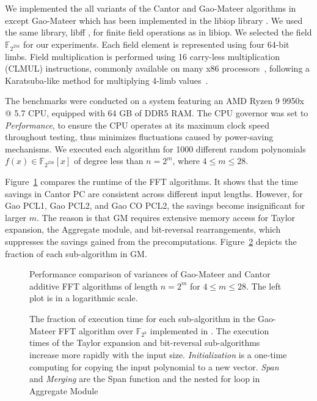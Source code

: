 We implemented the all variants of the Cantor and Gao-Mateer algorithms in \CC except Gao-Mateer which has been implemented in the libiop library \cite{libiop}. We used the same library, libff \cite{libff}, for finite field operations as in libiop. We selected the field $\mathbb{F}_{2^{256}}$ for our experiments. Each field element is represented using four 64-bit limbs. Field multiplication is performed using 16 carry-less multiplication (CLMUL) instructions, commonly available on many x86 processors~\cite{gueron2010intel}, following a Karatsuba-like method for multiplying 4-limb values~\cite{libiop}.

The benchmarks were conducted on a system featuring an AMD Ryzen 9 9950x @ 5.7 CPU, equipped with 64 GB of DDR5 RAM. The CPU governor was set to \textit{Performance}, to ensure the CPU operates at its maximum clock speed throughout testing, thus minimizes fluctuations caused by power-saving mechanisms.
We executed each algorithm for 1000 different random polynomials \( f(x) \in \mathbb{F}_{2^{256}}[x] \) of degree less than \( n = 2^m \), where \( 4 \leq m \leq 28 \).

Figure~\ref{fig:benchmark} compares the runtime of the FFT algorithms. It shows that the time savings in Cantor PC are consistent across different input lengths. However, for Gao PCL1, Gao PCL2, and Gao CO PCL2, the savings become insignificant for larger $m$. The reason is that GM requires extensive memory access for Taylor expansion, the \textsf{Aggregate} module, and bit-reversal rearrangements, which suppresses the savings gained from the precomputations.  Figure~\ref{fig:sub_parts_normalized} depicts the fraction of each sub-algorithm in GM.

\begin{figure}
	\centering
	\resizebox{\textwidth}{!}{
		
	}
	\caption{Performance comparison of variances of Gao-Mateer and Cantor additive FFT algorithms of length $n=2^m$ for $4\leq m \leq 28$. The left plot is in a logarithmic scale. }
	\label{fig:benchmark}
\end{figure}

\begin{figure}[ht!]
	\centering
	\resizebox{.9\textwidth}{!}{
		
	}
	\caption{The fraction of execution time for each sub-algorithm in the Gao-Mateer FFT algorithm over $\mathbb{F}_{2^k}$ implemented in \cite{libiop}. The execution times of the Taylor expansion and bit-reversal sub-algorithms increase more rapidly with the input size.  \textit{Initialization} is a one-time computing for copying the input polynomial to a new vector. \textit{Span} and \textit{Merging} are the \textsf{Span} function and the nested for loop in \textsf{Aggregate} Module}
	\label{fig:sub_parts_normalized}
\end{figure}

